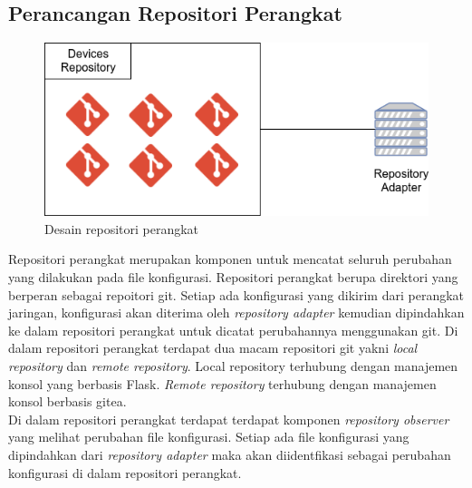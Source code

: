 		\subsection{Perancangan Repositori Perangkat}
		\begin{figure}[H]
			\centering
			\includegraphics[width=\textwidth]{Images/C-3/devices-repository.png}
			\caption{Desain repositori perangkat}
			\label{DesainRepositoriPerangkat}
		\end{figure}
			Repositori perangkat merupakan komponen untuk mencatat seluruh perubahan yang dilakukan pada file konfigurasi. Repositori perangkat berupa direktori yang berperan sebagai repoitori git. Setiap ada konfigurasi yang dikirim dari perangkat jaringan, konfigurasi akan diterima oleh \textit{repository adapter} kemudian dipindahkan ke dalam repositori perangkat untuk dicatat perubahannya menggunakan git. Di dalam repositori perangkat terdapat dua macam repositori git yakni \textit{local repository} dan \textit{remote repository}. Local repository terhubung dengan manajemen konsol yang berbasis Flask. \textit{Remote repository} terhubung dengan manajemen konsol berbasis gitea. \\
			\indent Di dalam repositori perangkat terdapat terdapat komponen \textit{repository observer} yang melihat perubahan file konfigurasi. Setiap ada file konfigurasi yang dipindahkan dari \textit{repository adapter} maka akan diidentfikasi sebagai perubahan konfigurasi di dalam repositori perangkat.

		
            
